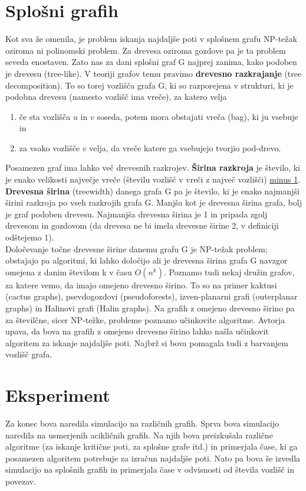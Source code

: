 \documentclass[a4paper, 12pt]{article}
\begin{document}
\section{Splošni grafih}
Kot sva že omenila, je problem iskanja najdaljše poti v splošnem grafu NP-težak oziroma ni polinomski problem. Za drevesa oziroma gozdove pa je ta problem seveda enostaven. Zato nas za dani splošni graf G najprej zanima, kako podoben je drevesu (tree-like). V teoriji grafov temu pravimo \textbf{drevesno razkrajanje} (tree decomposition). To so torej vozlišča grafa G, ki so razporejena v strukturi, ki je podobna drevesu (namesto vozlišč ima vreče), za katero velja 
\begin{enumerate}
    \item če sta vozlišča $u$ in $v$ soseda, potem mora obstajati vreča (bag), ki ju vsebuje in 
    \item  za vsako vozlišče $v$ velja, da vreče katere ga vsebujejo tvorjio pod-drevo.
\end{enumerate}
Posamezen graf ima lahko več drevesnih razkrojev. \textbf{Širina razkroja} je število, ki je enako velikosti največje vreče (številu vozlišč v vreči z največ vozlišči) \underline{minus 1}. \textbf{Drevesna širina} (treewidth) danega grafa G pa je število, ki je enako najmanjši širini razkroja po vseh razkrojih grafa G. Manjša kot je drevesna širina grafa, bolj je graf podoben drevesu. Najmanjša drevesna širina je 1 in pripada zgolj drevesom in gozdovom (da drevesa ne bi imela drevesne širine 2, v definiciji odštejemo 1). 
\\
Določevanje točne drevesne širine danemu grafu G je NP-težak problem; obstajajo pa algoritmi, ki lahko določijo ali je drevesna širina grafa G navzgor omejena z danim številom k v času $O(n^k)$. Poznamo tudi nekaj družin grafov, za katere vemo, da imajo omejeno drevesno širino. To so na primer kaktusi (cactus graphs), psevdogozdovi (pseudoforests), izven-planarni grafi (outerplanar graphs) in Halinovi grafi (Halin graphs). Na grafih z omejeno drevesno širino pa za številčne, sicer NP-težke, probleme poznamo učinkovite algoritme.
Avtorja upava, da bova na grafih z omejeno drevesno širino lahko našla učinkovit algoritem za iskanje najdaljše poti. Najbrž si bova pomagala tudi z barvanjem vozlišč grafa.

\section{Eksperiment}
Za konec bova naredila simulacijo na različnih grafih. Sprva bova simulacijo naredila na usmerjenih acikličnih grafih. Na njih bova preizkušala različne algoritme (za iskanje kritične poti, za splošne grafe itd.) in primerjala čase, ki ga posamezen algoritem potrebuje za izračun najdaljše poti. Nato pa bova še izvedla simulacijo na splošnih grafih in primerjala čase v odvisnosti od števila vozlišč in povezav.
\end{document}
